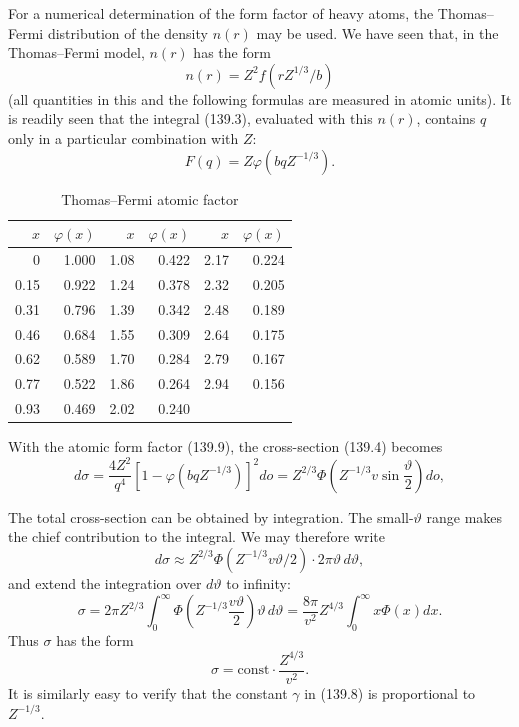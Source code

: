 For a numerical determination of the form factor of heavy atoms, the Thomas--Fermi distribution of the density $n(r)$ may be used. We have seen that, in the Thomas--Fermi model, $n(r)$ has the form
\[
 n(r)=Z^2f(rZ^{1/3}/b)
\]
(all quantities in this and the following formulas are measured in atomic units). It is readily seen that the integral (139.3), evaluated with this $n(r)$, contains $q$ only in a particular combination with $Z$:
\begin{equation}
 F(q)=Z\varphi(bqZ^{-1/3}).
 \tag{139.9}
\end{equation}


\setcounter{table}{10}
\begin{table}[htbp]
\centering
\caption{Thomas--Fermi atomic factor}
\begin{tabular}{@{}rr|rr|rr@{}}
\toprule
$x$ & $\varphi(x)$ & $x$ & $\varphi(x)$ & $x$ & $\varphi(x)$\\
\midrule
0    & 1.000 & 1.08 & 0.422 & 2.17 & 0.224\\
0.15 & 0.922 & 1.24 & 0.378 & 2.32 & 0.205\\
0.31 & 0.796 & 1.39 & 0.342 & 2.48 & 0.189\\
0.46 & 0.684 & 1.55 & 0.309 & 2.64 & 0.175\\
0.62 & 0.589 & 1.70 & 0.284 & 2.79 & 0.167\\
0.77 & 0.522 & 1.86 & 0.264 & 2.94 & 0.156\\
0.93 & 0.469 & 2.02 & 0.240 &      &      \\
\bottomrule
\end{tabular}
\end{table}

With the atomic form factor (139.9), the cross-section (139.4) becomes
\begin{equation}
 d\sigma=\frac{4Z^2}{q^4}[1-\varphi(bqZ^{-1/3})]^2d o
 =Z^{2/3}\Phi\left(Z^{-1/3}v\sin\frac\vartheta2\right)d o,
 \tag{139.10}
\end{equation}

The total cross-section can be obtained by integration. The small-$\vartheta$ range makes the chief contribution to the integral. We may therefore write
\[
 d\sigma\approx Z^{2/3}\Phi(Z^{-1/3}v\vartheta/2)\cdot2\pi\vartheta\,d\vartheta,
\]
and extend the integration over $d\vartheta$ to infinity:
\[
 \sigma=2\pi Z^{2/3}\int_0^\infty\Phi\left(Z^{-1/3}\frac{v\vartheta}{2}\right)
 \vartheta\,d\vartheta
 =\frac{8\pi}{v^2}Z^{4/3}\int_0^\infty x\Phi(x)dx.
\]
Thus $\sigma$ has the form
\begin{equation}
 \sigma=\mathrm{const}\cdot\frac{Z^{4/3}}{v^2}.
 \tag{139.11}
\end{equation}
It is similarly easy to verify that the constant $\gamma$ in (139.8) is proportional to $Z^{-1/3}$.

